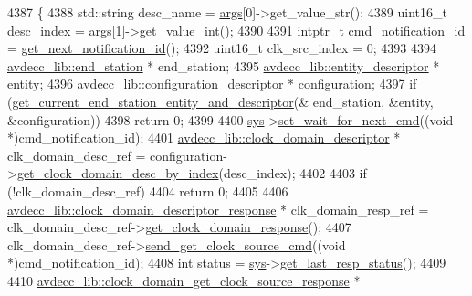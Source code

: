 \begin{DoxyCode}
4387 \{
4388     std::string desc\_name = \hyperlink{namespaceastime__fitline_a8187411843a6284ffb964ef3fb9fcab3}{args}[0]->get\_value\_str();
4389     uint16\_t desc\_index = \hyperlink{namespaceastime__fitline_a8187411843a6284ffb964ef3fb9fcab3}{args}[1]->get\_value\_int();
4390 
4391     intptr\_t cmd\_notification\_id = \hyperlink{classcmd__line_a57486218387d1aa9d262eb7c176154ad}{get\_next\_notification\_id}();
4392     uint16\_t clk\_src\_index = 0;
4393 
4394     \hyperlink{classavdecc__lib_1_1end__station}{avdecc\_lib::end\_station} * end\_station;
4395     \hyperlink{classavdecc__lib_1_1entity__descriptor}{avdecc\_lib::entity\_descriptor} * entity;
4396     \hyperlink{classavdecc__lib_1_1configuration__descriptor}{avdecc\_lib::configuration\_descriptor} * configuration;
4397     \textcolor{keywordflow}{if} (\hyperlink{classcmd__line_ac2d4611fba7db03d436a2e3c1e64828e}{get\_current\_end\_station\_entity\_and\_descriptor}(&
      end\_station, &entity, &configuration))
4398         \textcolor{keywordflow}{return} 0;
4399 
4400     \hyperlink{classcmd__line_a485db4800e331cb4052c447fdf5d154e}{sys}->\hyperlink{classavdecc__lib_1_1system_a26b769584f10225077da47583edda33e}{set\_wait\_for\_next\_cmd}((\textcolor{keywordtype}{void} *)cmd\_notification\_id);
4401     \hyperlink{classavdecc__lib_1_1clock__domain__descriptor}{avdecc\_lib::clock\_domain\_descriptor} * clk\_domain\_desc\_ref = 
      configuration->\hyperlink{classavdecc__lib_1_1configuration__descriptor_ab5603e0fa2cc0695b240fe856b62776d}{get\_clock\_domain\_desc\_by\_index}(desc\_index);
4402 
4403     \textcolor{keywordflow}{if} (!clk\_domain\_desc\_ref)
4404         \textcolor{keywordflow}{return} 0;
4405 
4406     \hyperlink{classavdecc__lib_1_1clock__domain__descriptor__response}{avdecc\_lib::clock\_domain\_descriptor\_response} * 
      clk\_domain\_resp\_ref = clk\_domain\_desc\_ref->\hyperlink{classavdecc__lib_1_1clock__domain__descriptor_a2c3eca99d20f1396befa4e71e438593c}{get\_clock\_domain\_response}();
4407     clk\_domain\_desc\_ref->\hyperlink{classavdecc__lib_1_1clock__domain__descriptor_a50997b6d5d23405c70f6d4ec7aa3f0dc}{send\_get\_clock\_source\_cmd}((\textcolor{keywordtype}{void} *)cmd\_notification\_id);
4408     \textcolor{keywordtype}{int} status = \hyperlink{classcmd__line_a485db4800e331cb4052c447fdf5d154e}{sys}->\hyperlink{classavdecc__lib_1_1system_aa63e8d1a4e51f695cdcccc9340922407}{get\_last\_resp\_status}();
4409 
4410     \hyperlink{classavdecc__lib_1_1clock__domain__get__clock__source__response}{avdecc\_lib::clock\_domain\_get\_clock\_source\_response} * 

\end{DoxyCode}
